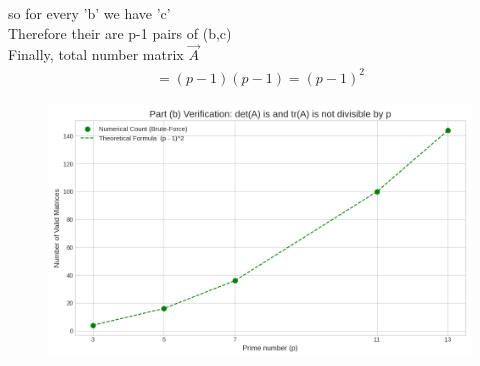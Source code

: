 \documentclass[journal]{IEEEtran}
\begin{document}
so for every 'b' we have 'c'\\
Therefore their are p-1 pairs of (b,c)\\
Finally, total number matrix $\vec{A}$
\begin{align}
    =(p-1)(p-1)
    =(p-1)^2
\end{align}
\begin{figure}[H]
    \centering
    \includegraphics[width=\columnwidth]{figs/figure_b.png}
    \caption{}
    \label{fig:placeholder}
\end{figure}
\end{document}
